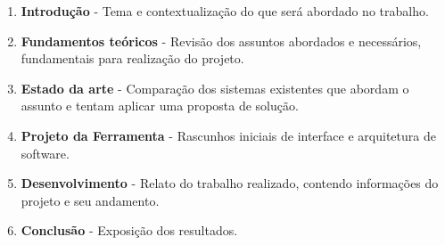 \begin{enumerate}
\item \textbf{Introdução} - Tema e contextualização do que será abordado no trabalho.
\item \textbf{Fundamentos teóricos} - Revisão dos assuntos abordados e necessários, fundamentais para realização do projeto.
\item \textbf{Estado da arte} - Comparação dos sistemas existentes que abordam o assunto e tentam aplicar uma proposta de solução.
\item \textbf{Projeto da Ferramenta} - Rascunhos iniciais de interface e arquitetura de software.
\item \textbf{Desenvolvimento} - Relato do trabalho realizado, contendo informações do projeto e seu andamento.
\item \textbf{Conclusão} - Exposição dos resultados.
\end{enumerate}
